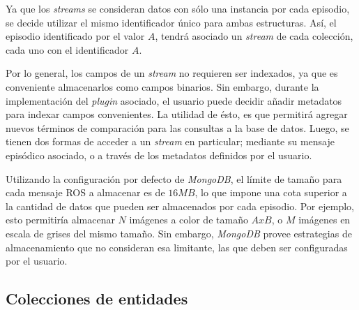 Ya que los \textit{streams} se consideran datos con sólo una instancia por cada episodio, se decide utilizar el mismo identificador único para ambas estructuras. Así, el episodio identificado por el valor $A$, tendrá asociado un \textit{stream} de cada colección, cada uno con el identificador $A$.


Por lo general, los campos de un \textit{stream} no requieren ser indexados, ya que es conveniente almacenarlos como campos binarios. Sin embargo, durante la implementación del \textit{plugin} asociado, el usuario puede decidir añadir metadatos para indexar campos convenientes. La utilidad de ésto, es que permitirá agregar nuevos términos de comparación para las consultas a la base de datos. Luego, se tienen dos formas de acceder a un \textit{stream} en particular; mediante su mensaje episódico asociado, o a través de los metadatos definidos por el usuario.

Utilizando la configuración por defecto de \textit{MongoDB}, el límite de tamaño para cada mensaje ROS a almacenar es de $16 MB$, lo que impone una cota superior a la cantidad de datos que pueden ser almacenados por cada episodio. Por ejemplo, esto permitiría almacenar $N$ imágenes a color de tamaño $AxB$, o $M$ imágenes en escala de grises del mismo tamaño. Sin embargo, \textit{MongoDB} provee estrategias de almacenamiento que no consideran esa limitante, las que deben ser configuradas por el usuario.



\subsection{Colecciones de entidades}

